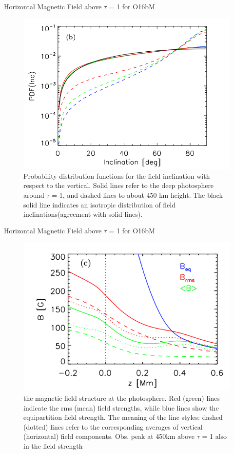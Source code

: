 \documentclass{beamer}
\begin{document}
\begin{frame}{Horizontal Magnetic Field above $\tau$ = 1 for O16bM}

\begin{figure}[H]
 \centering
 \includegraphics[scale=0.3]{img382.png}
	\caption{ Probability distribution functions for the field inclination with respect to the vertical. Solid lines refer to
the deep photosphere around $\tau$ = 1, and dashed lines to about 450 km height. 
The black solid line indicates an isotropic distribution of field inclinations(agreement with solid lines).}
\end{figure}

\end{frame}

\begin{frame}{Horizontal Magnetic Field above $\tau$ = 1 for O16bM}

\begin{figure}[H]
 \centering
 \includegraphics[scale=0.3]{img383.png}
	\caption{the magnetic field structure at the photosphere. Red (green) lines indicate
the rms (mean) field strengths, while blue lines show the equipartition field strength. The meaning of the line styles: dashed
(dotted) lines refer to the corresponding averages of vertical (horizontal) field components. Obs.
peak at 450km above $\tau$ = 1 also in the field strength}
\end{figure}

\end{frame}
\end{document}
